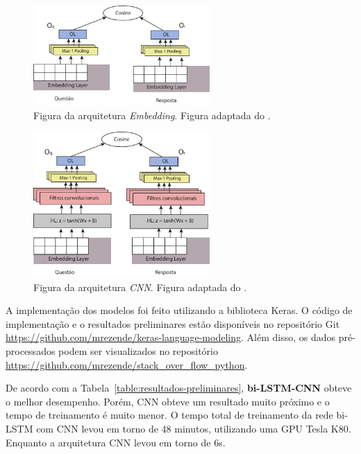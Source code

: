 \documentclass[12pt]{article}
\begin{document}
\begin{figure}[h]
    \centering
    \includegraphics[width=0.60\textwidth]{figures/ArquiteturaEmbedding.pdf}
    \caption{Figura da arquitetura \emph{Embedding}. Figura adaptada do \cite{tan-lstm-qa}.}
    \label{fig:arquitetura-embedding}
\end{figure}

\begin{figure}[h]
    \centering
    \includegraphics[width=0.60\textwidth]{figures/ArquiteturaCNN.pdf}
    \caption{Figura da arquitetura \emph{CNN}. Figura adaptada do \cite{tan-lstm-qa}.}
    \label{fig:arquitetura-cnn}
\end{figure}

A implementação dos modelos foi feito utilizando a biblioteca Keras. O código de implementação e o resultados preliminares estão disponíveis no repositório Git \url{https://github.com/mrezende/keras-language-modeling}. Além disso, os dados pré-processados podem ser visualizados no repositório \url{https://github.com/mrezende/stack_over_flow_python}.

De acordo com a Tabela~\ref{table:resultados-preliminares}, \textbf{bi-LSTM-CNN} obteve o melhor desempenho. Porém, CNN obteve um resultado muito próximo e o tempo de treinamento é muito menor. O tempo total de treinamento da rede bi-LSTM com CNN levou em torno de 48 minutos, utilizando uma GPU Tesla K80. Enquanto a arquitetura CNN levou em torno de 6s. 
\end{document}
